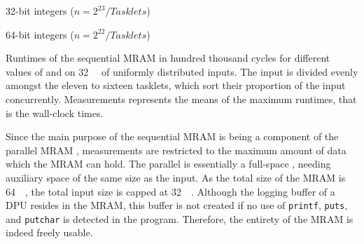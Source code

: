 \begin{table}[t]
	\centering
	\begin{subtable}{0.49\textwidth}
		\centering
		\pgfplotstabletypeset{\tableMergeMramXxxii}
		\caption{
			32-bit integers (\(n = 2^{23} / \mathit{Tasklets}\))
		}
	\end{subtable}
	\hfil
	\begin{subtable}{0.49\textwidth}
		\centering
		\pgfplotstabletypeset{\tableMergeMramLxiv}
		\caption{
			64-bit integers (\(n = 2^{22} / \mathit{Tasklets}\))
		}
	\end{subtable}

	\caption{
		Runtimes of the sequential \ac{MRAM} \MS{} in hundred thousand cycles for different values of \cachesize{} and \seqreadcachesize{} on \qty[exponent-mode=input]{32}{\mebi\byte} of uniformly distributed inputs.
		The input is divided evenly amongst the eleven to sixteen tasklets, which sort their proportion of the input concurrently.
		Measurements represents the means of the maximum runtimes, that is the wall-clock times.
	}
	\label{tab:mram:sizes}
\end{table}

Since the main purpose of the sequential \ac{MRAM} \MS{} is being a component of the parallel \ac{MRAM} \MS{}, measurements are restricted to the maximum amount of data which the \ac{MRAM} can hold.
The parallel \MS{} is essentially a full-space \MS{}, needing auxiliary space of the same size as the input.
As the total size of the \ac{MRAM} is \qty{64}{\mebi\byte}, the total input size is capped at \qty{32}{\mebi\byte}.
Although the logging buffer of a \ac{DPU} resides in the \ac{MRAM}, this buffer is not created if no use of \lstinline|printf|, \lstinline|puts|, and \lstinline|putchar| is detected in the program.
Therefore, the entirety of the \ac{MRAM} is indeed freely usable.


